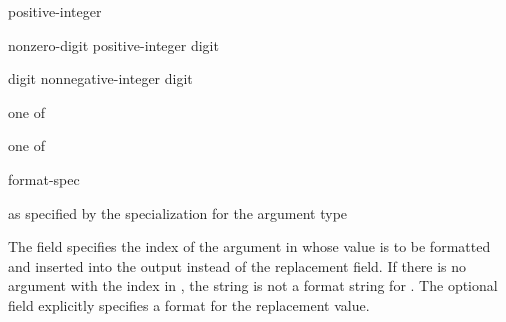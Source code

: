 \begin{ncbnf}
\br
    \br
    positive-integer
\end{ncbnf}

\begin{ncbnf}
\br
    nonzero-digit\br
    positive-integer digit
\end{ncbnf}

\begin{ncbnf}
\br
    digit\br
    nonnegative-integer digit
\end{ncbnf}

\begin{ncbnf}
 \textnormal{one of}\br
\end{ncbnf}

\begin{ncbnf}
 \textnormal{one of}\br
\end{ncbnf}

\begin{ncbnf}
\br
    \noncxxterminal{:} format-spec
\end{ncbnf}

\begin{ncbnf}
\br
    \textnormal{as specified by the  specialization for the argument type}
\end{ncbnf}

\pnum
The  field specifies the index of
the argument in 
whose value is to be formatted and inserted into the output
instead of the replacement field.
If there is no argument with
the index  in ,
the string is not a format string for .
The optional  field
explicitly specifies a format for the replacement value.

\pnum
\begin{example}
\begin{codeblock}
string s = format("{0}-{{", 8);         // value of  is 
\end{codeblock}
\end{example}

